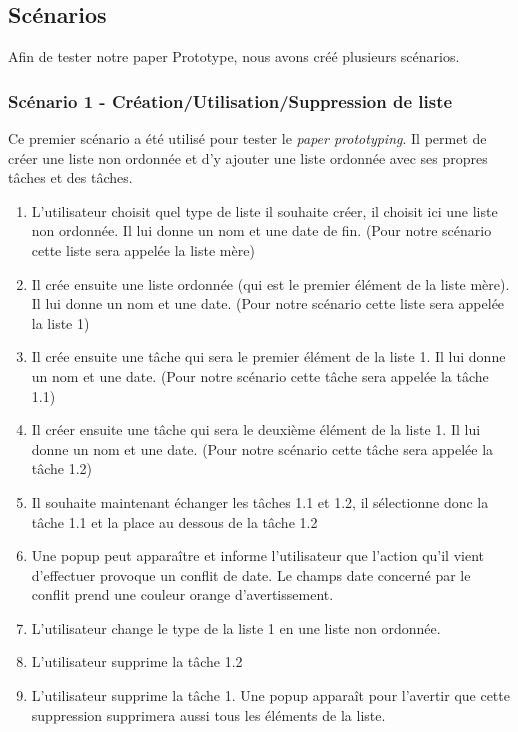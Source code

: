 \documentclass[a4paper,10pt]{article}
\newcommand{\paperPrototyping}{\emph{paper prototyping}}
\begin{document}
\subsection{Scénarios}
Afin de tester notre paper Prototype, nous avons créé plusieurs scénarios.
\subsubsection{Scénario 1 - Création/Utilisation/Suppression de liste}
Ce premier scénario a été utilisé pour tester le \paperPrototyping. Il permet de créer une liste non ordonnée et d'y ajouter une liste ordonnée avec ses propres
tâches et des tâches.
\begin{enumerate}
\item{L'utilisateur choisit quel type de liste il souhaite créer, il choisit ici une liste non ordonnée. Il lui donne un nom et une date de fin. (Pour notre scénario cette liste sera appelée la liste mère)}
\item{Il crée ensuite une liste ordonnée (qui est le premier élément de la liste mère). Il lui donne un nom et une date. (Pour notre scénario cette liste sera appelée la liste 1)}
\item{Il crée ensuite une tâche qui sera le premier élément de la liste 1. Il lui donne un nom et une date. (Pour notre scénario cette tâche sera appelée la tâche 1.1)}
\item{Il créer ensuite une tâche qui sera le deuxième élément de la liste 1. Il lui donne un nom et une date. (Pour notre scénario cette tâche sera appelée la tâche 1.2)}
\item{Il souhaite maintenant échanger les tâches 1.1 et 1.2, il sélectionne donc la tâche 1.1 et la place au dessous de la tâche 1.2}
\item{Une popup peut apparaître et informe l'utilisateur que l'action qu'il vient d'effectuer provoque un conflit de date. Le champs date concerné par le conflit prend une couleur orange d'avertissement.}
\item{L'utilisateur change le type de la liste 1 en une liste non ordonnée.}
\item{L'utilisateur supprime la tâche 1.2}
\item{L'utilisateur supprime la tâche 1. Une popup apparaît pour l'avertir que cette suppression supprimera aussi tous les éléments de la liste.}
\end{enumerate}
\end{document}
